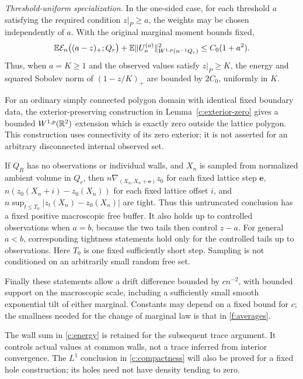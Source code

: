 \begin{theorem}
\emph{Threshold-uniform specialization.}
In the one-sided case, for each threshold $a$ satisfying the required
condition $z|_P\ge a$, the weights may be chosen independently of $a$.
With the original marginal moment bounds fixed,
\begin{equation}\label{c:threshold-scaling}
 \mathbb E\mathcal E_n\bigl((a-z)_+;Q_r\bigr)
 +\mathbb E\|U_n^{(a)}\|_{W^{1,p}(n^{-1}Q_r)}^2
 \le C_0(1+a^2).
\end{equation}
Thus, when $a=K\ge1$ and the observed values satisfy $z|_P\ge K$,
the energy and squared Sobolev norm of $(1-z/K)_+$ are bounded by
$2C_0$, uniformly in $K$.

For an ordinary simply connected polygon domain with identical fixed
boundary data, the exterior-preserving construction in
Lemma~\ref{c:exterior-zero} gives a bounded $W^{1,p}(\mathbb R^2)$ extension
which is exactly zero outside the lattice polygon. This construction
uses connectivity of its zero exterior; it is not asserted for an
arbitrary disconnected internal observed set.

If $Q_R$ has no observations or individual walls, and $X_n$ is sampled
from normalized ambient volume in $Q_r$, then
$n\nabla_{(X_n,X_n+\mathbf e)}z_0$ for each fixed lattice step $\mathbf e$,
$n(z_0(X_n+i)-z_0(X_n))$ for each fixed lattice offset $i$, and
$n\sup_{t\le T_0}|z_t(X_n)-z_0(X_n)|$ are tight. Thus this
untruncated conclusion has a fixed positive macroscopic free buffer.
It also holds up to controlled observations when $a=b$, because the
two tails then control $z-a$. For general $a<b$, corresponding
tightness statements hold only for the controlled tails up to
observations. Here $T_0$ is one fixed sufficiently short step.
Sampling is not conditioned on an arbitrarily small random free set.

Finally these statements allow a drift difference bounded by $c n^{-2}$,
with bounded support on the macroscopic scale, including a sufficiently
small smooth exponential tilt of either marginal. Constants may depend
on a fixed bound for $c$; the smallness needed for the change of marginal
law is that in \ref{f:averages}.
\end{theorem}

The wall sum in \eqref{c:energy} is retained for the subsequent trace
argument. It controls actual values at common walls, not a trace inferred
from interior convergence. The $L^1$ conclusion in \eqref{c:compactness}
will also be proved for a fixed hole construction; its holes need not
have density tending to zero.

